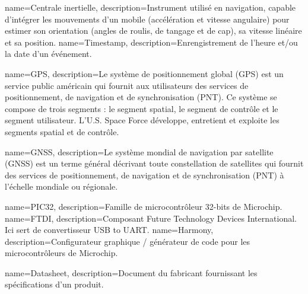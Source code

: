 
{
	name=Centrale inertielle,
	description={Instrument utilisé en navigation, capable d'intégrer les mouvements d'un mobile (accélération et vitesse angulaire) pour estimer son orientation (angles de roulis, de tangage et de cap), sa vitesse linéaire et sa position.}
}
{
	name=Timestamp,
	description={Enrengistrement de l'heure et/ou la date d'un événement.}
}

{
	name=GPS,
	description={Le système de positionnement global (GPS) est un service public américain qui fournit aux utilisateurs des services de positionnement, de navigation et de synchronisation (PNT). Ce système se compose de trois segments : le segment spatial, le segment de contrôle et le segment utilisateur. L'U.S. Space Force développe, entretient et exploite les segments spatial et de contrôle.}
}

{
	name=GNSS,
	description={Le système mondial de navigation par satellite (GNSS) est un terme général décrivant toute constellation de satellites qui fournit des services de positionnement, de navigation et de synchronisation (PNT) à l'échelle mondiale ou régionale.}
}

{
	name=PIC32,
	description={Famille de microcontrôleur 32-bits de Microchip.}
}
{
	name=FTDI,
	description={Composant Future Technology Devices International. Ici sert de convertisseur USB to UART.}
}
{
	name=Harmony,
	description={Configurateur graphique / générateur de code pour les microcontrôleurs de Microchip.}
}

{
	name=Datasheet,
	description={Document du fabricant fournissant les spécifications d'un produit.}
}






